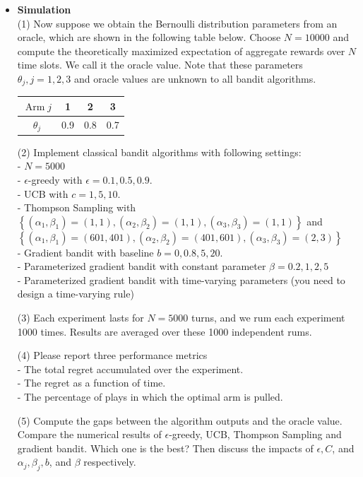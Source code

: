 \begin{itemize}
\item \textbf{Simulation} \\
(1) Now suppose we obtain the Bernoulli distribution parameters from an oracle, which are shown in the following table below. Choose $N=10000$ and compute the theoretically maximized expectation of aggregate rewards over $N$ time slots. We call it the oracle value. Note that these parameters $\theta_j, j=1,2,3$ and oracle values are unknown to all bandit algorithms.
\begin{center}
\begin{tabular}{|c|c|c|c|}
    \hline $\operatorname{Arm} j$ & 1 & 2 & 3 \\
    \hline$\theta_j$ & 0.9 & 0.8 & 0.7 \\
    \hline
\end{tabular}
\end{center}

(2) Implement classical bandit algorithms with following settings: \\
- $N=5000$ \\
- $\epsilon$-greedy with $\epsilon=0.1,0.5,0.9$. \\
- UCB with $c=1,5,10$. \\
- Thompson Sampling with \\
$\left\{\left(\alpha_1, \beta_1\right)=(1,1),\left(\alpha_2, \beta_2\right)=(1,1),\left(\alpha_3, \beta_3\right)=(1,1)\right\}$ and \\
$\left\{\left(\alpha_1, \beta_1\right)=(601,401),\left(\alpha_2, \beta_2\right)=(401,601),\left(\alpha_3, \beta_3\right)=(2,3)\right\}$ \\
- Gradient bandit with baseline $b=0,0.8,5,20$. \\
- Parameterized gradient bandit with constant parameter $\beta=0.2,1,2,5$ \\
- Parameterized gradient bandit with time-varying parameters (you need to design a time-varying rule)

(3) Each experiment lasts for $N=5000$ turns, and we rum each experiment 1000 times. Results are averaged over these 1000 independent rums.

(4) Please report three performance metrics \\
- The total regret accumulated over the experiment. \\
- The regret as a function of time. \\
- The percentage of plays in which the optimal arm is pulled.

(5) Compute the gaps between the algorithm outputs and the oracle value. Compare the numerical results of $\epsilon$-greedy, UCB, Thompson Sampling and gradient bandit. Which one is the best? Then discuss the impacts of $\epsilon, C$, and $\alpha_j, \beta_j, b$, and $\beta$ respectively.


\end{itemize}

